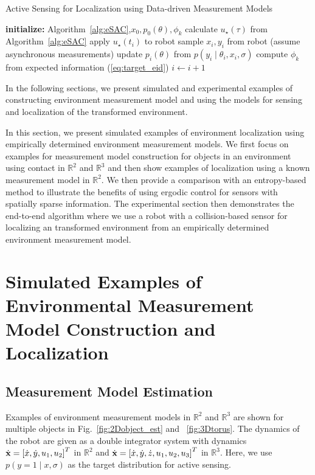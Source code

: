 \documentclass[conference]{IEEEtran}
\begin{document}
\begin{algorithm}
\caption{Active Sensing for Localization using Data-driven Measurement Models} \label{alg:obj_local}
\centering
\begin{algorithmic}[1]
\State \textbf{initialize:} Algorithm~\ref{alg:eSAC},$x_0, p_0(\theta), \phi_k$
\State calculate $u_\star(\tau)$ from Algorithm~\ref{alg:eSAC}
\State apply $u_\star(t_i)$ to robot
\State sample $x_i, y_i$ from robot (assume asynchronous measurements)
\State update $p_i(\theta)$ from $p(y_i \mid \theta_i, x_i, \sigma)$
\State compute $\phi_k$ from expected information (\ref{eq:target_eid})
\State $i \gets i +1$
\EndWhile
\end{algorithmic}
\end{algorithm}



In the following sections, we present simulated and experimental examples of constructing environment measurement model and using the models for sensing and localization of the transformed environment.


In this section, we present simulated examples of environment localization using empirically determined environment measurement models.
We first focus on examples for measurement model construction for objects in an environment using contact in $\mathbb{R}^2$ and $\mathbb{R}^3$ and then show examples of localization using a known measurement model in $\mathbb{R}^2$.
We then provide a comparison with an entropy-based method to illustrate the benefits of using ergodic control for sensors with spatially sparse information.
The experimental section then demonstrates the end-to-end algorithm where we use a robot with a collision-based sensor for localizing an transformed environment from an empirically determined environment measurement model.

\section{Simulated Examples of Environmental Measurement Model Construction and Localization}
\label{sec:sim_ex}

\subsection{Measurement Model Estimation}
Examples of environment measurement models in $\mathbb{R}^2$ and $\mathbb{R}^3$ are shown for multiple objects in Fig.~\ref{fig:2Dobject_est} and ~\ref{fig:3Dtorus}.
The dynamics of the robot are given as a double integrator system with dynamics $\dot{\bold{x}} = \left[ \dot{x}, \dot{y}, u_1, u_2 \right]^T$ in $\mathbb{R}^2$ and $\dot{\bold{x}} = \left[ \dot{x}, \dot{y}, \dot{z}, u_1, u_2, u_3 \right]^T$ in $\mathbb{R}^3$.
Here, we use $p(y=1 \mid x, \sigma)$ as the target distribution for active sensing.
\end{document}
